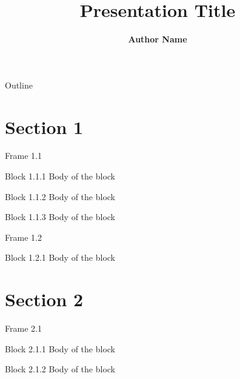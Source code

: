 \documentclass[9pt]{beamer}
\title[Beamer Name]{Presentation Title} %
\author[Author name in the beamer]{ \textbf{\Large Author Name}} %
\institute[Associated University]{\large Presenters Position \\Associated Depertment
}
\date{}
\begin{document}
\frame[plain]{\titlepage}


\begin{frame}{Outline}
  \tableofcontents
\end{frame}

\section{Section 1}

\begin{frame}{Frame 1.1}

\begin{block}{Block 1.1.1}
Body of the block
\end{block}

\pause

\begin{block}{Block 1.1.2}
Body of the block
\end{block}
    
\pause

\begin{block}{Block 1.1.3}
Body of the block
\end{block}
\end{frame}

\begin{frame}{Frame 1.2}

\begin{block}{Block 1.2.1}
Body of the block
\end{block}
\end{frame}

\section{Section 2}

\begin{frame}{Frame 2.1}
    \begin{block}{Block 2.1.1}
    Body of the block
    \end{block}
    
    \pause
    
    \begin{block}{Block 2.1.2}
    Body of the block
    \end{block}
\end{frame}
\end{document}
